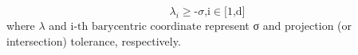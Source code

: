 \begin{equation} \label{eq:projtol}
	\lambda _i\text{$\geq $-$\sigma $,i$\in $[1,d]}
\end{equation}
where $\lambda$ and $\text{i-th barycentric coordinate}$ represent σ and projection (or intersection) tolerance, respectively.